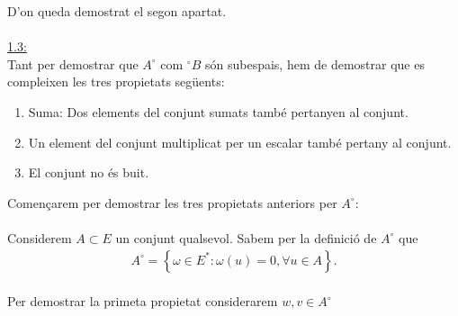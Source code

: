 \documentclass[a4paper, 11pt]{article}
\begin{document}
    D'on queda demostrat el segon apartat.\\\\
    \underline{1.3:}\\
    Tant per demostrar que $ A^\circ $ com $ ^\circ B $ s\'on subespais, hem de demostrar que es compleixen les tres propietats seg\"uents:
    \begin{enumerate}
        \item Suma: Dos elements del conjunt sumats tamb\'e pertanyen al conjunt.
        \item Un element del conjunt multiplicat per un escalar tamb\'e pertany al conjunt.
        \item El conjunt no \'es buit.
    \end{enumerate}
    Començarem per demostrar les tres propietats anteriors per $ A^\circ $:\\\\
    Considerem $ A \subset E $ un conjunt qualsevol. Sabem per la definici\'o de $ A^\circ $ que
    \begin{gather*}
        A^\circ = \left\{ \omega \in E^*: \omega(u) = 0, \forall u \in A \right\}.
    \end{gather*}
    \\
    Per demostrar la primeta propietat considerarem $ w,v \in A^\circ$
\end{document}

